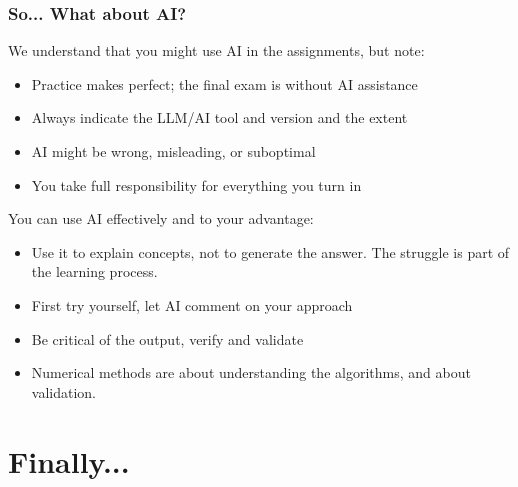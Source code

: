 \begin{frame}
 \frametitle{So... What about AI?}
    We understand that you might use AI in the assignments, but note:
    \begin{itemize}
      \item Practice makes perfect; the final exam is without AI assistance
      \item Always indicate the LLM/AI tool and version and the extent
      \item AI might be wrong, misleading, or suboptimal
      \item You take full responsibility for everything you turn in
    \end{itemize}
    You can use AI effectively and to your advantage:
    \begin{itemize}
      \item Use it to explain concepts, not to generate the answer. The struggle is part of the learning process.
      \item First try yourself, let AI comment on your approach
      \item Be critical of the output, verify and validate
      \item Numerical methods are about understanding the algorithms, and about validation. 
    \end{itemize}
\end{frame}


\section{Finally...}
